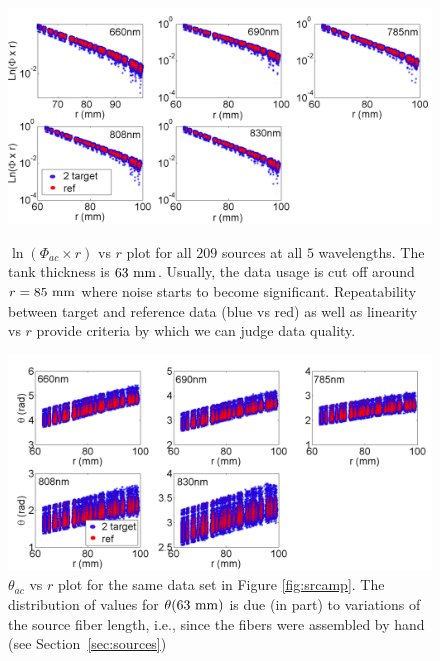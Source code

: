 \begin{figure}[hp]
\centering
\includegraphics[width=14.5cm]{./figures/4_Gen3/srcamp.png}
\caption[$\ln (\Phi_{ac}\times r)$ vs $r$ plots for all source-detector pairs of the Gen3 imager]{$\ln (\Phi_{ac}\times r)$ vs $r$ plot for all $209$ sources at all $5$ wavelengths. The tank thickness is $63~\rm{mm}$. Usually, the data usage is cut off around $r=85~\rm{mm}$ where noise starts to become significant. Repeatability between target and reference data (blue vs red) as well as linearity vs $r$ provide criteria by which we can judge data quality.}
\label{fig:srcamp}
\vspace{10mm}
\includegraphics[width=14.5cm]{./figures/4_Gen3/srcphase.png}
\caption[$\theta_{ac}$ vs $r$ plots for all sources and detectors of the Gen3 imager]{$\theta_{ac}$ vs $r$ plot for the same data set in Figure \ref{fig:srcamp}. The distribution of values for $\theta(63~\rm{mm})$ is due (in part) to variations of the source fiber length, i.e., since the fibers were assembled by hand (see Section~\ref{sec:sources})}
\label{fig:srcphase}
\end{figure}
